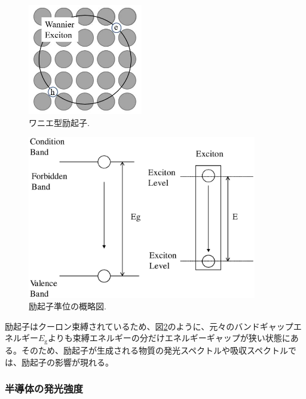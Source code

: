 \documentclass[11pt,a4j]{jsarticle}
\begin{document}
\begin{figure}[h]
 \centering
 \includegraphics[clip,width=5cm]{start_exciton.jpg}
 \caption{ワニエ型励起子.}
 \label{fig_exciton1}
\end{figure}

\begin{figure}[h]
 \centering
 \includegraphics[clip,width=10cm]{start_exciton_binding.eps}
 \caption{励起子準位の概略図.}
 \label{fig_exciton2}
\end{figure}

励起子はクーロン束縛されているため、図\ref{fig_exciton2}のように、元々のバンドギャップエネルギー$E_{\mathrm{g}}$よりも束縛エネルギーの分だけエネルギーギャップが狭い状態にある。そのため、励起子が生成される物質の発光スペクトルや吸収スペクトルでは、励起子の影響が現れる。

\subsubsection{半導体の発光強度}
\end{document}
